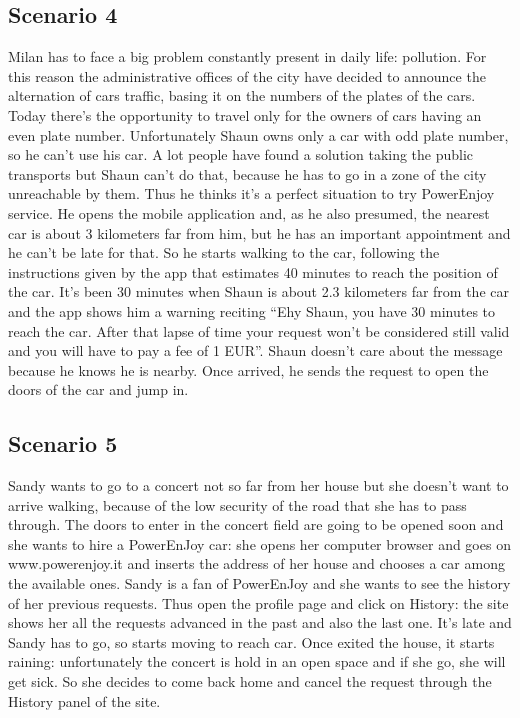 \subsection{Scenario 4}
Milan has to face a big problem constantly present in daily life: pollution.
For this reason the administrative offices of the city have decided to announce the alternation of cars traffic, basing it on the numbers of the plates of the cars.
Today there’s the opportunity to travel only for the owners of cars having an even plate number.
Unfortunately Shaun owns only a car with odd plate number, so he can’t use his car.
A lot people have found a solution taking the public transports but Shaun can’t do that, because he has to go in a zone of the city unreachable by them.
Thus he thinks it’s a perfect situation to try PowerEnjoy service.
He opens the mobile application and, as he also presumed, the nearest car is about 3 kilometers far from him, but he has an important appointment and he can’t be late for that.
So he starts walking to the car, following the instructions given by the app that estimates 40 minutes to reach the position of the car.
It’s been 30 minutes when Shaun is about 2.3 kilometers far from the car and the app shows him a warning reciting “Ehy Shaun, you have 30 minutes to reach the car.
After that lapse of time your request won’t be considered still valid and you will have to pay a fee of 1 EUR”.
Shaun doesn’t care about the message because he knows he is nearby.
Once arrived, he sends the request to open the doors of the car and jump in.

\subsection{Scenario 5}
Sandy wants to go to a concert not so far from her house but she doesn’t want to arrive walking, because of the low security of the road that she has to pass through.
The doors to enter in the concert field are going to be opened soon and she wants to hire a PowerEnJoy car: she opens her computer browser and goes on www.powerenjoy.it and inserts the address of her house and chooses a car among the available ones.
Sandy is a fan of PowerEnJoy and she wants to see the history of her previous requests.
Thus open the profile page and click on History: the site shows her all the requests advanced in the past and also the last one.
It’s late and Sandy has to go, so starts moving to reach car.
Once exited the house, it starts raining: unfortunately the concert is hold in an open space and if she go, she will get sick.
So she decides to come back home and cancel the request through the History panel of the site.

